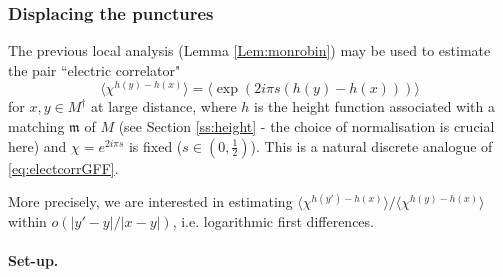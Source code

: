\documentclass[10pt]{article}
\newcommand{\mf}{\mathfrak}
\newcommand{\dg}{\dagger}
\begin{document}
\subsubsection{Displacing the punctures}

The previous local analysis (Lemma \ref{Lem:monrobin}) may be used to estimate the pair ``electric correlator" 
$$\langle \chi^{h(y)-h(x)}\rangle=\langle\exp(2i\pi s(h(y)-h(x)))\rangle$$
for $x,y\in M^\dg$ at large distance, where $h$ is the height function associated with a matching ${\mf m}$ of $M$ (see Section \ref{ss:height} - the choice of normalisation is crucial here) and $\chi=e^{2i\pi s}$ is fixed ($s\in (0,\frac 12)$). This is a natural discrete analogue of \eqref{eq:electcorrGFF}.

More precisely, we are interested in estimating $\langle \chi^{h(y')-h(x)}\rangle/\langle\chi^{h(y)-h(x)}\rangle$ within $o(|y'-y|/|x-y|)$, i.e. logarithmic first differences. 

\paragraph{Set-up.}
\end{document}
